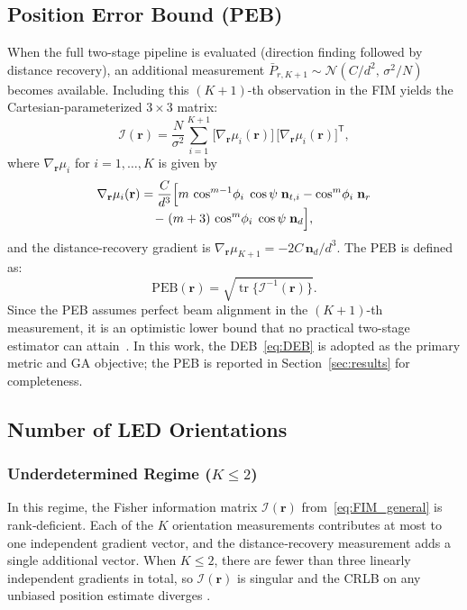 \documentclass[journal]{IEEEtran}
\begin{document}
\subsection{Position Error Bound (PEB)}
\label{subsec:PEB}

When the full two-stage pipeline is evaluated (direction finding followed by distance recovery), an additional measurement $\bar P_{r,K+1}\sim\mathcal{N}(C/d^2,\,\sigma^2/N)$ becomes available.  Including this $(K{+}1)$-th observation in the FIM yields the Cartesian-parameterized $3\times3$ matrix:
\begin{equation}
\mathcal{I}(\mathbf r)
= \frac{N}{\sigma^{2}}
  \sum_{i=1}^{K+1}
  \bigl[\nabla_{\mathbf r}\mu_i(\mathbf r)\bigr]\,
  \bigl[\nabla_{\mathbf r}\mu_i(\mathbf r)\bigr]^{\!\mathsf T},
\label{eq:FIM_general}
\end{equation}
where $\nabla_{\mathbf r}\mu_i$ for $i=1,\ldots,K$ is given by
\begin{multline}
    \nabla_{\mathbf r}\mu_i(\mathbf r)
    = \frac{C}{d^{3}}
      \Bigl[
        m\,\cos^{m-1}\!\phi_i\;\cos\psi\;\mathbf n_{t,i}
        -
        \cos^{m}\!\phi_i\;\mathbf n_{r}
    \\[-3pt]
        -\;
        (m+3)\,\cos^{m}\!\phi_i\;\cos\psi\;\mathbf n_{d}
      \Bigr],
    \label{eq:grad_mu_closed}
\end{multline}
and the distance-recovery gradient is $\nabla_{\mathbf r}\mu_{K+1} = -2C\,\mathbf n_d/d^3$.  The PEB is defined as:
\begin{equation}
\mathrm{PEB}(\mathbf r)
= \sqrt{\operatorname{tr}\!\bigl\{\mathcal{I}^{-1}(\mathbf r)\bigr\}}.
\label{eq:PEB}
\end{equation}
Since the PEB assumes perfect beam alignment in the $(K{+}1)$-th measurement, it is an optimistic lower bound that no practical two-stage estimator can attain~\cite{Kay1993}.  In this work, the DEB~\eqref{eq:DEB} is adopted as the primary metric and GA objective; the PEB is reported in Section~\ref{sec:results} for completeness.

\subsection{Number of LED Orientations}
\label{subsec:Kchoice}

\subsubsection{Underdetermined Regime (\(K\le2\))}
In this regime, the Fisher information matrix
\(\mathcal{I}(\mathbf r)\) from~\eqref{eq:FIM_general} is rank‐deficient.
Each of the \(K\) orientation measurements contributes at most to one
independent gradient vector, and the distance‐recovery measurement adds
a single additional vector.  When \(K\le2\), there are fewer than three
linearly independent gradients in total, so \(\mathcal{I}(\mathbf r)\) is
singular and the CRLB on any unbiased position estimate diverges
\cite{Zhuang2018}.
\end{document}
